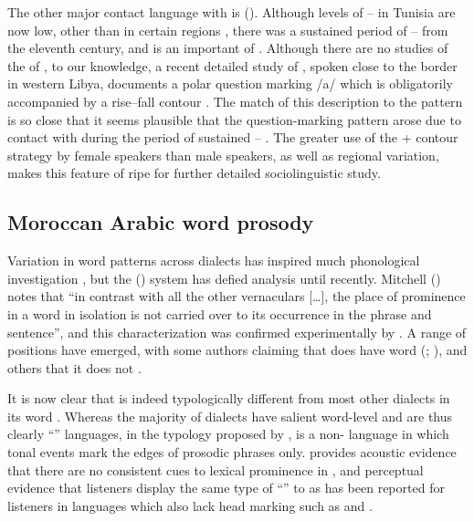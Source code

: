 \documentclass[output=paper]{langsci/langscibook}
\begin{document}
The other major contact language with  is  (). Although levels of --  in Tunisia are now low, other than in certain regions \citep{Gabsi2011}, there was a sustained period of --  from the eleventh century, and  is an important  of  \citep{Daoud2007}. Although there are no studies of the  of , to our knowledge, a recent detailed study of  , spoken close to the  border in western Libya, documents a polar question marking  /a/ which is obligatorily accompanied by a rise--fall contour \citep{Gussenhoven2017}. The match of this description to the  pattern is so close that it seems plausible that the  question-marking pattern arose due to contact with  during the period of sustained -- . The greater use of the  + contour strategy by female speakers than male speakers, as well as regional variation, makes this feature of  ripe for further detailed sociolinguistic study.


 
 \subsection{Moroccan Arabic word prosody} \label{moroc}


Variation in word  patterns across  dialects has inspired much phonological investigation \citep{Watson2011stress}, but the  ()  system has defied analysis until recently. Mitchell (\citeyear[202]{Mitchell1993}) notes that “in contrast with all the other vernaculars […], the place of prominence in a word in isolation is not carried over to its occurrence in the phrase and sentence”, and this characterization was confirmed experimentally by \citet{Boudlal2001}. A range of positions have emerged, with some authors claiming that  does have word  (\citealt{Benkirane1998}; \citealt{BurdinEtAl2014}), and others that it does not \citep{ElZarka2012,Maas2013}. 

It is now clear that  is indeed typologically different from most other  dialects in its word . Whereas the majority of  dialects have salient word-level  and are thus clearly ``'' languages, in the typology proposed by \citet{Jun2005},  is a non- language in which tonal events mark the edges of prosodic phrases only. \citet{Bruggeman2018} provides acoustic evidence that there are no consistent cues to lexical prominence in , and perceptual evidence that  listeners display the same type of ``'' to  as has been reported for listeners in languages which also lack head marking such as  \citep{DupouxPeperkamp2001} and  \citep{RahmaniRietveldGussenhoven2015}.
\end{document}
